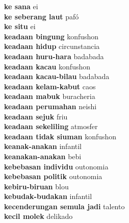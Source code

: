 \textbf{ ke sana  } ei \\
\textbf{ ke seberang laut  } pafó \\
\textbf{ ke situ  } ei \\
\textbf{ keadaan bingung  } konfushon \\
\textbf{ keadaan hidup  } circunstancia \\
\textbf{ keadaan huru-hara  } badabada \\
\textbf{ keadaan kacau  } konfushon \\
\textbf{ keadaan kacau-bilau  } badabada \\
\textbf{ keadaan kelam-kabut  } caos \\
\textbf{ keadaan mabuk  } buracheria \\
\textbf{ keadaan perumahan  } neishi \\
\textbf{ keadaan sejuk  } friu \\
\textbf{ keadaan sekeliling  } atmosfer \\
\textbf{ keadaan tidak siuman  } konfushon \\
\textbf{ keanak-anakan  } infantil \\
\textbf{ keanakan-anakan  } bebi \\
\textbf{ kebebasan individu  } outonomia \\
\textbf{ kebebasan politik  } outonomia \\
\textbf{ kebiru-biruan  } blou \\
\textbf{ kebudak-budakan  } infantil \\
\textbf{ kecenderungan semula jadi  } talento \\
\textbf{ kecil molek  } delikado \\
